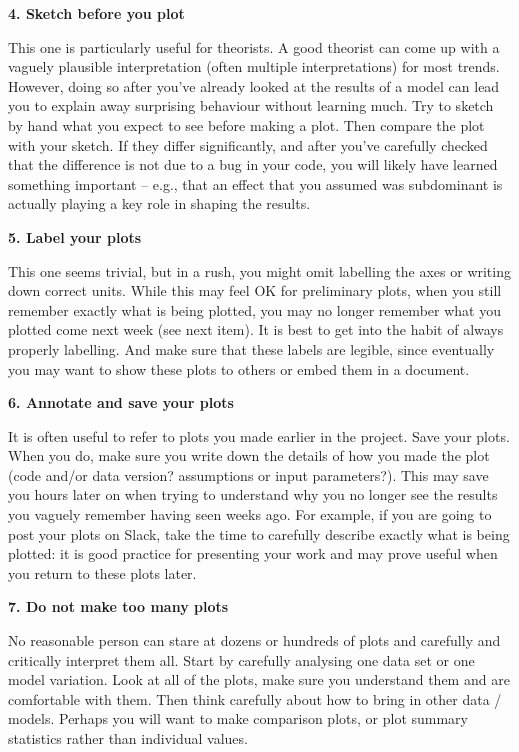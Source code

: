\documentclass[onecolumn]{aastex7}
\newcommand{\Header}[1]{{\large{\bf{#1}}}}
\begin{document}
\Header{4. Sketch before you plot}

This one is particularly useful for theorists.  A good theorist can come up with a vaguely plausible interpretation (often multiple interpretations) for most trends.  However, doing so after you've already looked at the results of a model can lead you to explain away surprising behaviour without learning much.  Try to sketch by hand what you expect to see before making a plot.  Then compare the plot with your sketch.  If they differ significantly, and after you've carefully checked that the difference is not due to a bug in your code, you will likely have learned something important -- e.g., that an effect that you assumed was subdominant is actually playing a key role in shaping the results.

\Header{5. Label your plots}

This one seems trivial, but in a rush, you might omit labelling the axes or writing down correct units.  While this may feel OK for preliminary plots, when you still remember exactly what is being plotted, you may no longer remember what you plotted come next week (see next item).  It is best to get into the habit of always properly labelling.  And make sure that these labels are legible, since eventually you may want to show these plots to others or embed them in a document.

\Header{6. Annotate and save your plots}

It is often useful to refer to plots you made earlier in the project.  Save your plots.  When you do, make sure you write down the details of how you made the plot (code and/or data version? assumptions or input parameters?).  This may save you hours later on when trying to understand why you no longer see the results you vaguely remember having seen weeks ago.  For example, if you are going to post your plots on Slack, take the time to carefully describe exactly what is being plotted: it is good practice for presenting your work and may prove useful when you return to these plots later.

\Header{7. Do not make too many plots}

No reasonable person can stare at dozens or hundreds of plots and carefully and critically interpret them all.  Start by carefully analysing one data set or one model variation.  Look at all of the plots, make sure you understand them and are comfortable with them.  Then think carefully about how to bring in other data / models.  Perhaps you will want to make comparison plots, or plot summary statistics rather than individual values.
\end{document}
